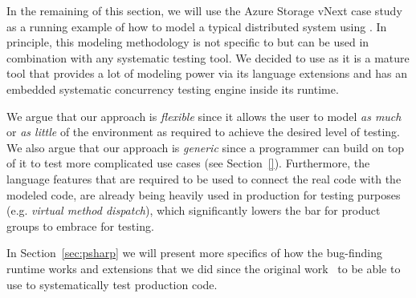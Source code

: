 In the remaining of this section, we will use the Azure Storage vNext case study as a running example of how to model a typical distributed system using \psharp. In principle, this modeling methodology is not specific to \psharp but can be used in combination with any systematic testing tool. We decided to use \psharp as it is a mature tool that provides a lot of modeling power via its \csharp language extensions and has an embedded systematic concurrency testing engine inside its runtime.

We argue that our approach is \emph{flexible} since it allows the user to model \emph{as much} or \emph{as little} of the environment as required to achieve the desired level of testing. We also argue that our approach is \emph{generic} since a programmer can build on top of it to test more complicated use cases (see Section~\ref{}). Furthermore, the language features that are required to be used to connect the real code with the modeled code, are already being heavily used in production for testing purposes (e.g. \emph{virtual method dispatch}), which significantly lowers the bar for product groups to embrace \psharp for testing.

In Section~\ref{sec:psharp} we will present more specifics of how the \psharp bug-finding runtime works and extensions that we did since the original work~\cite{deligiannis2015psharp} to be able to use \psharp to systematically test production code.

